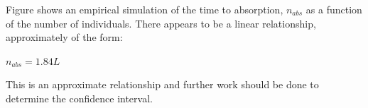 \documentclass{article}
\begin{document}
Figure shows an empirical simulation of the time to absorption, $n_{abs}$ as a function of the number of individuals. There appears to be a linear relationship, approximately of the form:

$n_{abs} = 1.84L $

This is an approximate relationship and further work should be done to determine the confidence interval.
\end{document}
